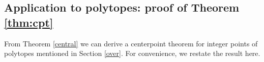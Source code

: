 \documentclass{daj}
\renewcommand{\ge}{\geqslant}
\newcommand{\R}{\mathbb R}
\newcommand{\Q}{\mathbb Q}
\newtheorem{theorem}{Theorem}[section]
\theoremstyle{definition}
\theoremstyle{remark}
\theoremstyle{definition}
\theoremstyle{definition}
\begin{document}
\subsection{Application to polytopes: proof of Theorem \ref{thm:cpt}}\label{polyhelly}

From Theorem \ref{central} we can derive a centerpoint theorem for integer points of polytopes mentioned in Section \ref{over}. For convenience, we restate the result here.


\maintheorem*

\end{document}
